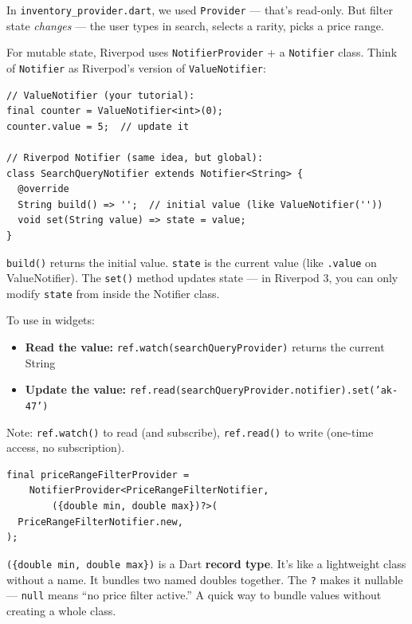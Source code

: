\documentclass[11pt, a4paper]{article}
\begin{document}
\begin{conceptbox}[title=\textbf{NotifierProvider --- Mutable State in Riverpod}]
In \texttt{inventory\_provider.dart}, we used \texttt{Provider} --- that's read-only. But filter state \emph{changes} --- the user types in search, selects a rarity, picks a price range.

For mutable state, Riverpod uses \texttt{NotifierProvider} + a \texttt{Notifier} class. Think of \texttt{Notifier} as Riverpod's version of \texttt{ValueNotifier}:

\begin{lstlisting}[numbers=none]
// ValueNotifier (your tutorial):
final counter = ValueNotifier<int>(0);
counter.value = 5;  // update it

// Riverpod Notifier (same idea, but global):
class SearchQueryNotifier extends Notifier<String> {
  @override
  String build() => '';  // initial value (like ValueNotifier(''))
  void set(String value) => state = value;
}
\end{lstlisting}

\texttt{build()} returns the initial value. \texttt{state} is the current value (like \texttt{.value} on ValueNotifier). The \texttt{set()} method updates state --- in Riverpod 3, you can only modify \texttt{state} from inside the Notifier class.

To use in widgets:
\begin{itemize}
    \item \textbf{Read the value:} \texttt{ref.watch(searchQueryProvider)} returns the current String
    \item \textbf{Update the value:} \texttt{ref.read(searchQueryProvider.notifier).set('ak-47')}
\end{itemize}

Note: \texttt{ref.watch()} to read (and subscribe), \texttt{ref.read()} to write (one-time access, no subscription).
\end{conceptbox}

\begin{conceptbox}[title=\textbf{Record Types --- Lightweight Data Bundles}]
\begin{lstlisting}[numbers=none]
final priceRangeFilterProvider =
    NotifierProvider<PriceRangeFilterNotifier,
        ({double min, double max})?>(
  PriceRangeFilterNotifier.new,
);
\end{lstlisting}

\texttt{(\{double min, double max\})} is a Dart \textbf{record type}. It's like a lightweight class without a name. It bundles two named doubles together. The \texttt{?} makes it nullable --- \texttt{null} means ``no price filter active.'' A quick way to bundle values without creating a whole class.
\end{conceptbox}
\end{document}
